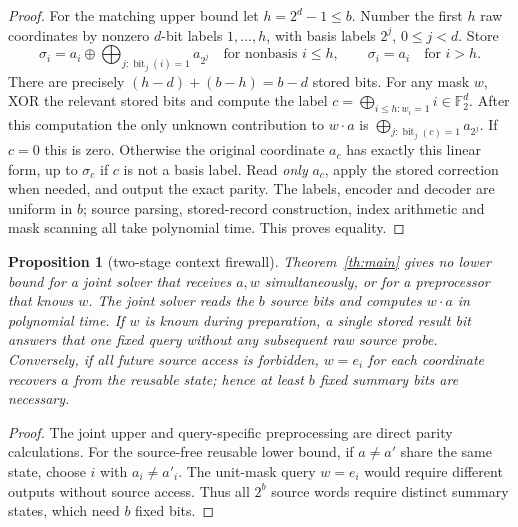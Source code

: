 \documentclass[10pt]{article}
\newtheorem{proposition}[theorem]{Proposition}
\newcommand{\F}{\mathbb F_2}
\begin{document}
\begin{proof}
For the matching upper bound let $h=2^d-1\le b$. Number the first $h$ raw coordinates by nonzero $d$-bit labels $1,\dots,h$, with basis labels $2^j$, $0\le j<d$. Store
\[
 \sigma_i=a_i\oplus\bigoplus_{j:\operatorname{bit}_j(i)=1}a_{2^j}
 \quad\text{for nonbasis }i\le h,
 \qquad \sigma_i=a_i\quad\text{for }i>h.
\]
There are precisely $(h-d)+(b-h)=b-d$ stored bits. For any mask $w$, XOR the relevant stored bits and compute the label $c=\bigoplus_{i\le h:w_i=1}i\in\F^d$. After this computation the only unknown contribution to $w\cdot a$ is $\bigoplus_{j:\operatorname{bit}_j(c)=1}a_{2^j}$. If $c=0$ this is zero. Otherwise the original coordinate $a_c$ has exactly this linear form, up to $\sigma_c$ if $c$ is not a basis label. Read \emph{only} $a_c$, apply the stored correction when needed, and output the exact parity. The labels, encoder and decoder are uniform in $b$; source parsing, stored-record construction, index arithmetic and mask scanning all take polynomial time. This proves equality.
\end{proof}

\begin{proposition}[two-stage context firewall]\label{prop:firewall}
Theorem~\ref{th:main} gives no lower bound for a joint solver that receives $a,w$ simultaneously, or for a preprocessor that knows $w$. The joint solver reads the $b$ source bits and computes $w\cdot a$ in polynomial time. If $w$ is known during preparation, a single stored result bit answers that one fixed query without any subsequent raw source probe. Conversely, if \emph{all future source access is forbidden}, $w=e_i$ for each coordinate recovers $a$ from the reusable state; hence at least $b$ fixed summary bits are necessary.
\end{proposition}
\begin{proof}
The joint upper and query-specific preprocessing are direct parity calculations. For the source-free reusable lower bound, if $a\ne a'$ share the same state, choose $i$ with $a_i\ne a'_i$. The unit-mask query $w=e_i$ would require different outputs without source access. Thus all $2^b$ source words require distinct summary states, which need $b$ fixed bits.\end{proof}
\end{document}
